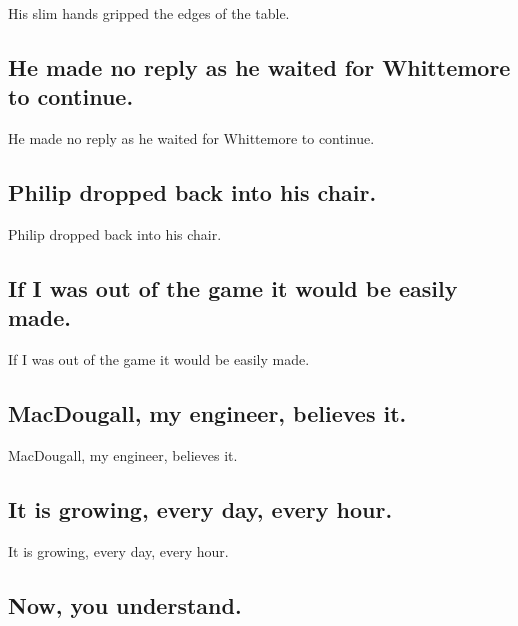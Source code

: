\documentclass[]{article}
\begin{document}
His slim hands gripped the edges of the table.

\hypertarget{he-made-no-reply-as-he-waited-for-whittemore-to-continue.}{%
\subsection{He made no reply as he waited for Whittemore to
continue.}\label{he-made-no-reply-as-he-waited-for-whittemore-to-continue.}}

He made no reply as he waited for Whittemore to continue.

\hypertarget{philip-dropped-back-into-his-chair.}{%
\subsection{Philip dropped back into his
chair.}\label{philip-dropped-back-into-his-chair.}}

Philip dropped back into his chair.

\hypertarget{if-i-was-out-of-the-game-it-would-be-easily-made.}{%
\subsection{If I was out of the game it would be easily
made.}\label{if-i-was-out-of-the-game-it-would-be-easily-made.}}

If I was out of the game it would be easily made.

\hypertarget{macdougall-my-engineer-believes-it.}{%
\subsection{MacDougall, my engineer, believes
it.}\label{macdougall-my-engineer-believes-it.}}

MacDougall, my engineer, believes it.

\hypertarget{it-is-growing-every-day-every-hour.}{%
\subsection{It is growing, every day, every
hour.}\label{it-is-growing-every-day-every-hour.}}

It is growing, every day, every hour.

\hypertarget{now-you-understand.}{%
\subsection{Now, you understand.}\label{now-you-understand.}}
\end{document}
